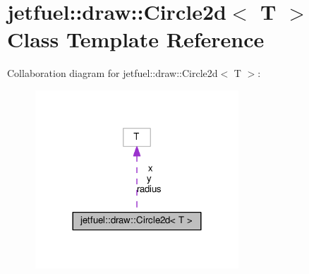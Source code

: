 \hypertarget{classjetfuel_1_1draw_1_1Circle2d}{}\section{jetfuel\+:\+:draw\+:\+:Circle2d$<$ T $>$ Class Template Reference}
\label{classjetfuel_1_1draw_1_1Circle2d}


Collaboration diagram for jetfuel\+:\+:draw\+:\+:Circle2d$<$ T $>$\+:
\nopagebreak
\begin{figure}[H]
\begin{center}
\leavevmode
\includegraphics[width=216pt]{classjetfuel_1_1draw_1_1Circle2d__coll__graph}
\end{center}
\end{figure}
